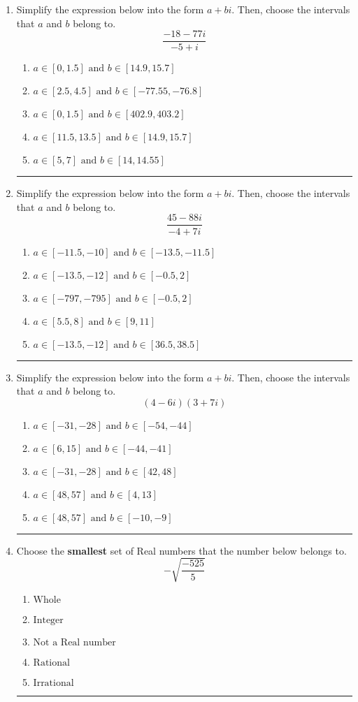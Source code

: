 \documentclass[14pt]{extbook}
\newcommand{\litem}[1]{\item#1\hspace*{-1cm}\rule{\textwidth}{0.4pt}}
\begin{document}
\begin{enumerate}
\litem{
Simplify the expression below into the form $a+bi$. Then, choose the intervals that $a$ and $b$ belong to.\[ \frac{-18 - 77 i}{-5 + i} \]\begin{enumerate}[label=\Alph*.]
\item \( a \in [0, 1.5] \text{ and } b \in [14.9, 15.7] \)
\item \( a \in [2.5, 4.5] \text{ and } b \in [-77.55, -76.8] \)
\item \( a \in [0, 1.5] \text{ and } b \in [402.9, 403.2] \)
\item \( a \in [11.5, 13.5] \text{ and } b \in [14.9, 15.7] \)
\item \( a \in [5, 7] \text{ and } b \in [14, 14.55] \)

\end{enumerate} }
\litem{
Simplify the expression below into the form $a+bi$. Then, choose the intervals that $a$ and $b$ belong to.\[ \frac{45 - 88 i}{-4 + 7 i} \]\begin{enumerate}[label=\Alph*.]
\item \( a \in [-11.5, -10] \text{ and } b \in [-13.5, -11.5] \)
\item \( a \in [-13.5, -12] \text{ and } b \in [-0.5, 2] \)
\item \( a \in [-797, -795] \text{ and } b \in [-0.5, 2] \)
\item \( a \in [5.5, 8] \text{ and } b \in [9, 11] \)
\item \( a \in [-13.5, -12] \text{ and } b \in [36.5, 38.5] \)

\end{enumerate} }
\litem{
Simplify the expression below into the form $a+bi$. Then, choose the intervals that $a$ and $b$ belong to.\[ (4 - 6 i)(3 + 7 i) \]\begin{enumerate}[label=\Alph*.]
\item \( a \in [-31, -28] \text{ and } b \in [-54, -44] \)
\item \( a \in [6, 15] \text{ and } b \in [-44, -41] \)
\item \( a \in [-31, -28] \text{ and } b \in [42, 48] \)
\item \( a \in [48, 57] \text{ and } b \in [4, 13] \)
\item \( a \in [48, 57] \text{ and } b \in [-10, -9] \)

\end{enumerate} }
\litem{
Choose the \textbf{smallest} set of Real numbers that the number below belongs to.\[ -\sqrt{\frac{-525}{5}} \]\begin{enumerate}[label=\Alph*.]
\item \( \text{Whole} \)
\item \( \text{Integer} \)
\item \( \text{Not a Real number} \)
\item \( \text{Rational} \)
\item \( \text{Irrational} \)


\end{enumerate}}
\end{enumerate}
\end{document}
